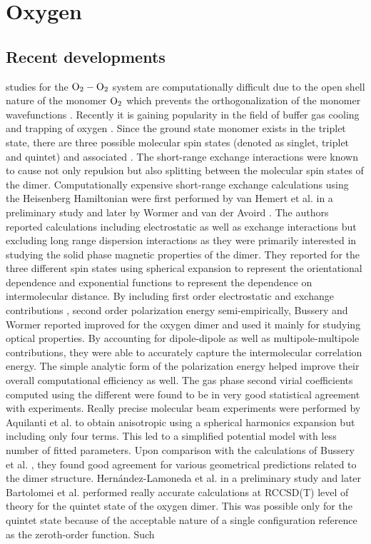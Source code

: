 \chapter{Oxygen}
\label{chap:o2}
\section{Recent developments}
    \Abinitio{} studies for the ${\rm O_2 - O_2}$ system are computationally difficult due to the open shell nature of the monomer $\rm{O_2}$ which prevents the orthogonalization of the monomer wavefunctions \cite{Bussery1993}. Recently it is gaining popularity in the field of buffer gas cooling and trapping of oxygen \cite{Friedrich1998,Avdeenkov2001}. Since the ground state monomer exists in the triplet state, there are three possible molecular spin states (denoted as singlet, triplet and quintet) and associated \PESs{}. The short-range exchange interactions were known to cause not only repulsion but also splitting between the molecular spin states of the dimer. Computationally expensive short-range exchange calculations using the Heisenberg Hamiltonian were first performed by van Hemert et al. \cite{vanHemert1983} in a preliminary study and later by Wormer and van der Avoird \cite{Wormer1984}. The authors reported \abinitio{} calculations including electrostatic as well as exchange interactions but excluding long range dispersion interactions as they were primarily interested in studying the solid phase magnetic properties of the dimer. They reported \PESs{} for the three different spin states using spherical expansion to represent the orientational dependence and exponential functions to represent the dependence on intermolecular distance.  By including first order electrostatic and exchange contributions \abinitio{}, second order polarization energy semi-empirically, Bussery and Wormer \cite{Bussery1993} reported improved \PESs{} for the oxygen dimer and used it mainly for studying optical properties. By accounting for dipole-dipole as well as multipole-multipole contributions, they were able to accurately capture the intermolecular correlation energy. The simple analytic form of the polarization energy helped improve their overall computational efficiency as well. The gas phase second virial coefficients computed using the different \PESs{} were found to be in very good statistical agreement with experiments. Really precise molecular beam experiments were performed by Aquilanti et al. \cite{Aquilanti1999} to obtain anisotropic \PESs{} using a spherical harmonics expansion but including only four terms. This led to a simplified potential model with less number of fitted parameters. Upon comparison with the \abinitio{} calculations of Bussery et al. \cite{Bussery1993}, they found good agreement for various geometrical predictions related to the dimer structure. Hernández-Lamoneda et al. \cite{Lamoneda2005CPL} in a preliminary study and later Bartolomei et al. \cite{Bartolomei2008} performed really accurate \abinitio{} calculations at RCCSD(T) level of theory for the quintet state of the oxygen dimer. This was possible only for the quintet state because of the acceptable nature of a single configuration reference as the zeroth-order function. Such 